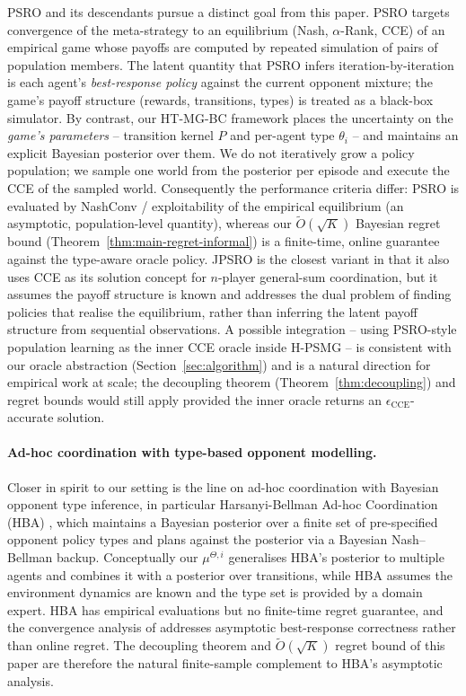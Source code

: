 \documentclass{article}
\begin{document}
PSRO and its descendants pursue a distinct goal from this paper. PSRO targets convergence of the meta-strategy to an equilibrium (Nash, $\alpha$-Rank, CCE) of an empirical game whose payoffs are computed by repeated simulation of pairs of population members. The latent quantity that PSRO infers iteration-by-iteration is each agent's \emph{best-response policy} against the current opponent mixture; the game's payoff structure (rewards, transitions, types) is treated as a black-box simulator. By contrast, our HT-MG-BC framework places the uncertainty on the \emph{game's parameters} -- transition kernel $P$ and per-agent type $\theta_i$ -- and maintains an explicit Bayesian posterior over them. We do not iteratively grow a policy population; we sample one world from the posterior per episode and execute the CCE of the sampled world. Consequently the performance criteria differ: PSRO is evaluated by NashConv / exploitability of the empirical equilibrium (an asymptotic, population-level quantity), whereas our $\tilde O(\sqrt K)$ Bayesian regret bound (Theorem~\ref{thm:main-regret-informal}) is a finite-time, online guarantee against the type-aware oracle policy. JPSRO is the closest variant in that it also uses CCE as its solution concept for $n$-player general-sum coordination, but it assumes the payoff structure is known and addresses the dual problem of finding policies that realise the equilibrium, rather than inferring the latent payoff structure from sequential observations. A possible integration -- using PSRO-style population learning as the inner CCE oracle inside H-PSMG -- is consistent with our oracle abstraction (Section~\ref{sec:algorithm}) and is a natural direction for empirical work at scale; the decoupling theorem (Theorem~\ref{thm:decoupling}) and regret bounds would still apply provided the inner oracle returns an $\epsilon_{\mathrm{CCE}}$-accurate solution.

\paragraph{Ad-hoc coordination with type-based opponent modelling.}
Closer in spirit to our setting is the line on ad-hoc coordination with Bayesian opponent type inference, in particular Harsanyi-Bellman Ad-hoc Coordination (HBA) \citep{albrecht2013game,albrecht2019convergence}, which maintains a Bayesian posterior over a finite set of pre-specified opponent policy types and plans against the posterior via a Bayesian Nash--Bellman backup. Conceptually our $\mu^{\Theta, i}$ generalises HBA's posterior to multiple agents and combines it with a posterior over transitions, while HBA assumes the environment dynamics are known and the type set is provided by a domain expert. HBA has empirical evaluations but no finite-time regret guarantee, and the convergence analysis of \citet{albrecht2019convergence} addresses asymptotic best-response correctness rather than online regret. The decoupling theorem and $\tilde O(\sqrt K)$ regret bound of this paper are therefore the natural finite-sample complement to HBA's asymptotic analysis.
\end{document}
